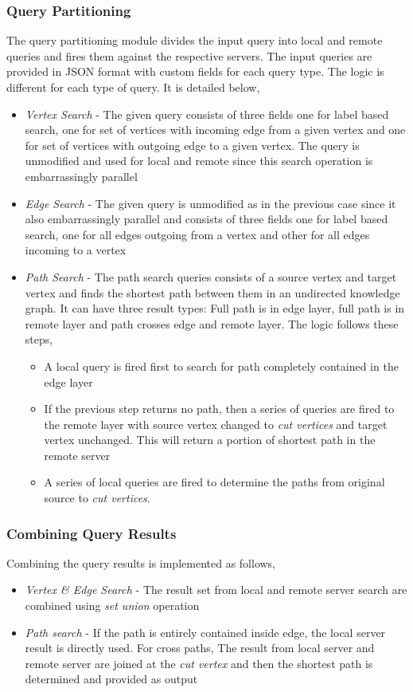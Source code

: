\documentclass[conference]{IEEEtran}
\begin{document}
\subsubsection{Query Partitioning}
The query partitioning module divides the input query into local and remote queries and fires them against the respective servers. The input queries are provided in JSON format with custom fields for each query type. The logic is different for each type of query. It is detailed below,
\begin{itemize}%
	\item \emph{Vertex Search} - The given query consists of three fields one for label based search, one for set of vertices with incoming edge from a given vertex and one for set of vertices with outgoing edge to a given vertex. The query is unmodified and used for local and remote since this search operation is embarrassingly parallel
	\item \emph{Edge Search} - The given query is unmodified as in the previous case since it also embarrassingly parallel and consists of three fields one for label based search, one for all edges outgoing from a vertex and other for all edges incoming to a vertex
	\item \emph{Path Search} - The path search queries consists of a source vertex and target vertex and finds the shortest path between them in an undirected knowledge graph. It can have three result types: Full path is in edge layer, full path is in remote layer and path crosses edge and remote layer. The logic follows these steps,
	\begin{itemize}
		\item A local query is fired first to search for path completely contained in the edge layer
		\item If the previous step returns no path, then a series of queries are fired to the remote layer with source vertex changed to \emph{cut vertices} and target vertex unchanged. This will return a portion of shortest path in the remote server
		\item A series of local queries are fired to determine the paths from original source to \emph{cut vertices}. 
	\end{itemize}
\end{itemize}

\subsubsection{Combining Query Results}
Combining the query results is implemented as follows,
\begin{itemize}
	\item \emph{Vertex \& Edge Search} - The result set from local and remote server search are combined using \emph{set union} operation
	\item \emph{Path search} - If the path is entirely contained inside edge, the local server result is directly used. For cross paths, The result from local server and remote server are joined at the \emph{cut vertex} and then the shortest path is determined and provided as output
\end{itemize}
\end{document}
